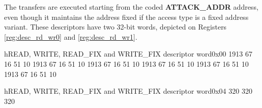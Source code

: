 The transfers are executed starting from the coded \textbf{ATTACK\_ADDR} address, even though it maintains the address fixed if the access type is a fixed 
address variant.
These descriptors have two 32-bit words, depicted on Registers \ref{reg:desc_rd_wr0} and \ref{reg:desc_rd_wr1}. 

\begin{register}{h}{READ, WRITE, READ\_FIX and WRITE\_FIX descriptor word}{0x00}
  \label{reg:desc_rd_wr0}
  \reglabelc{}
  \regfieldb{}              {19}{13}
  \regfieldb{}              {6}{7}
  \regfieldb{}              {1}{6}
  \regfieldb{}              {5}{1}
  \regfieldb{}              {1}{0}
  \reglabelc{}
           {19}{13}
            {6}{7}
            {1}{6}
            {5}{1}
            {1}{0}
         {19}{13}
        {6}{7}
      {1}{6}
        {5}{1}
         {1}{0}
         {19}{13}
        {6}{7}
      {1}{6}
        {5}{1}
         {1}{0}
         {19}{13}
        {6}{7}
      {1}{6}
        {5}{1}
         {1}{0}
         {19}{13}
        {6}{7}
      {1}{6}
        {5}{1}
         {1}{0}
  \regnewline
\end{register}  
\begin{register}{h}{READ, WRITE, READ\_FIX and WRITE\_FIX descriptor word}{0x04}
  \label{reg:desc_rd_wr1}
  \regfieldb{}                {32}{0}
             {32}{0}
   {32}{0}
  \regnewline
\end{register}



